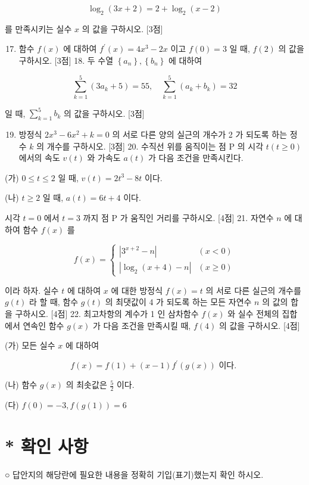 \documentclass[10pt]{article}
\begin{document}
$$
\log _{2}(3 x+2)=2+\log _{2}(x-2)
$$

를 만족시키는 실수 $x$ 의 값을 구하시오. [3점]

\begin{enumerate}
  \setcounter{enumi}{16}
  \item 함수 $f(x)$ 에 대하여 $f^{\prime}(x)=4 x^{3}-2 x$ 이고 $f(0)=3$ 일 때, $f(2)$ 의 값을 구하시오. [3점] 18. 두 수열 $\left\{a_{n}\right\},\left\{b_{n}\right\}$ 에 대하여
\end{enumerate}

$$
\sum_{k=1}^{5}\left(3 a_{k}+5\right)=55, \quad \sum_{k=1}^{5}\left(a_{k}+b_{k}\right)=32
$$

일 때, $\sum_{k=1}^{5} b_{k}$ 의 값을 구하시오. [3점]

\begin{enumerate}
  \setcounter{enumi}{18}
  \item 방정식 $2 x^{3}-6 x^{2}+k=0$ 의 서로 다른 양의 실근의 개수가 2 가 되도록 하는 정수 $k$ 의 개수를 구하시오. [3점] 20. 수직선 위를 움직이는 점 $\mathrm{P}$ 의 시각 $t(t \geq 0)$ 에서의 속도 $v(t)$ 와 가속도 $a(t)$ 가 다음 조건을 만족시킨다.
\end{enumerate}

(가) $0 \leq t \leq 2$ 일 때, $v(t)=2 t^{3}-8 t$ 이다.

(나) $t \geq 2$ 일 때, $a(t)=6 t+4$ 이다.

시각 $t=0$ 에서 $t=3$ 까지 점 $\mathrm{P}$ 가 움직인 거리를 구하시오. [4점] 21. 자연수 $n$ 에 대하여 함수 $f(x)$ 를

$$
f(x)= \begin{cases}\left|3^{x+2}-n\right| & (x<0) \\ \left|\log _{2}(x+4)-n\right| & (x \geq 0)\end{cases}
$$

이라 하자. 실수 $t$ 에 대하여 $x$ 에 대한 방정식 $f(x)=t$ 의 서로 다른 실근의 개수를 $g(t)$ 라 할 때, 함수 $g(t)$ 의 최댓값이 4 가 되도록 하는 모든 자연수 $n$ 의 값의 합을 구하시오. [4점] 22. 최고차항의 계수가 1 인 삼차함수 $f(x)$ 와 실수 전체의 집합에서 연속인 함수 $g(x)$ 가 다음 조건을 만족시킬 때, $f(4)$ 의 값을 구하시오. [4점]

(가) 모든 실수 $x$ 에 대하여

$$
f(x)=f(1)+(x-1) f^{\prime}(g(x)) \text { 이다. }
$$

(나) 함수 $g(x)$ 의 최솟값은 $\frac{5}{2}$ 이다.

(다) $f(0)=-3, f(g(1))=6$

\section{* 확인 사항}
○ 답안지의 해당란에 필요한 내용을 정확히 기입(표기)했는지 확인 하시오.
\end{document}
